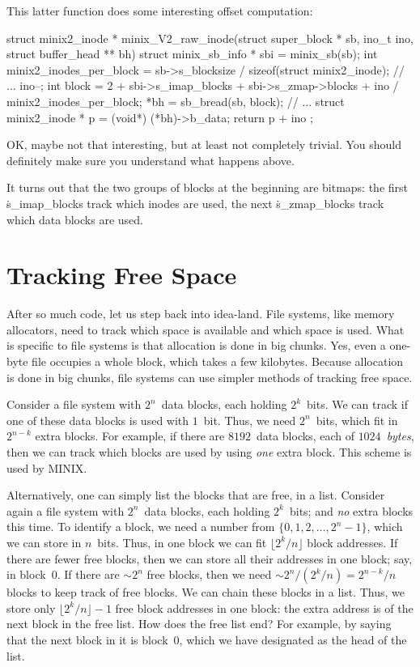 This latter function does some interesting offset computation:
\begin{ccode}
struct minix2_inode *
minix_V2_raw_inode(struct super_block * sb, ino_t ino, struct buffer_head ** bh) {
  struct minix_sb_info * sbi = minix_sb(sb);
  int minix2_inodes_per_block = sb->s_blocksize / sizeof(struct minix2_inode);
  // ...
  ino--;
  int block = 2 + sbi->s_imap_blocks + sbi->s_zmap->blocks
    + ino / minix2_inodes_per_block;
  *bh = sb_bread(sb, block);
  // ...
  struct minix2_inode * p = (void*) (*bh)->b_data;
  return p + ino %
};
\end{ccode}
OK, maybe not that interesting, but at least not completely trivial.
You should definitely make sure you understand what happens above.

\smallskip

It turns out that the two groups of blocks at the beginning are bitmaps:
  the first \.{s\_imap\_blocks} track which inodes are used,
  the next \.{s\_zmap\_blocks} track which data blocks are used.

\section*{Tracking Free Space}

After so much code, let us step back into idea-land.
File systems, like memory allocators,
  need to track which space is available and which space is used.
What is specific to file systems is that allocation is done in big chunks.
Yes, even a one-byte file occupies a whole block, which takes a few kilobytes.
Because allocation is done in big chunks,
  file systems can use simpler methods of tracking free space.

Consider a file system with $2^n$~data blocks, each holding $2^k$~bits.
We can track if one of these data blocks is used with $1$~bit.
Thus, we need $2^n$~bits, which fit in $2^{n-k}$ extra blocks.
For example, if there are $8192$~data blocks, each of $1024$~\emph{bytes},
  then we can track which blocks are used by using \emph{one} extra block.
This scheme is used by MINIX\null.

Alternatively, one can simply list the blocks that are free, in a list.
Consider again a file system with $2^n$~data blocks, each holding $2^k$~bits;
  and \emph{no} extra blocks this time.
To identify a block, we need a number from $\{0,1,2,\ldots,2^n-1\}$,
  which we can store in $n$~bits.
Thus, in one block we can fit $\lfloor 2^k/n\rfloor$ block addresses.
If there are fewer free blocks, then we can store all their addresses in one block;
  say, in block~$0$.
If there are $\sim 2^n$ free blocks,
  then we need $\sim 2^n/(2^k/n)=2^{n-k}/n$ blocks to keep track of free blocks.
We can chain these blocks in a list.
Thus, we store only $\lfloor 2^k/n \rfloor - 1$ free block addresses in one block:
  the extra address is of the next block in the free list.
How does the free list end?
For example, by saying that the next block in it is block~$0$,
  which we have designated as the head of the list.


